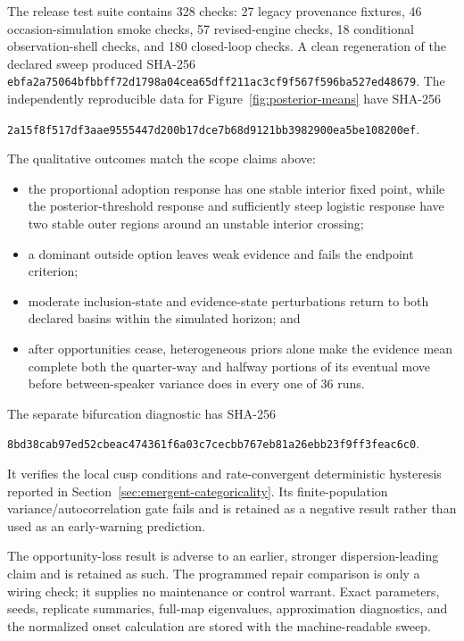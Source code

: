 \documentclass[12pt,letterpaper]{article}
\begin{document}
The release test suite contains 328 checks: 27 legacy provenance fixtures, 46
occasion-simulation smoke checks, 57 revised-engine checks, 18 conditional
observation-shell checks, and 180 closed-loop checks. A clean regeneration of
the declared sweep produced SHA-256
\nolinkurl{ebfa2a75064bfbbff72d1798a04cea65dff211ac3cf9f567f596ba527ed48679}.
The independently reproducible data for Figure~\ref{fig:posterior-means} have
SHA-256
\begin{center}
\small\nolinkurl{2a15f8f517df3aae9555447d200b17dce7b68d9121bb3982900ea5be108200ef}.
\end{center}
The qualitative outcomes match the scope claims above:

\begin{itemize}
\item the proportional adoption response has one stable interior fixed point,
  while the posterior-threshold response and sufficiently steep logistic
  response have two stable outer regions around an unstable interior crossing;
\item a dominant outside option leaves weak evidence and fails the endpoint
  criterion;
\item moderate inclusion-state and evidence-state perturbations return to both
  declared basins within the simulated horizon; and
\item after opportunities cease, heterogeneous priors alone make the evidence
  mean complete both the quarter-way and halfway portions of its eventual move
  before between-speaker variance does in every one of 36 runs.
\end{itemize}

The separate bifurcation diagnostic has SHA-256
\begin{center}
\small\nolinkurl{8bd38cab97ed52cbeac474361f6a03c7cecbb767eb81a26ebb23f9ff3feac6c0}.
\end{center}
It verifies the local cusp conditions and rate-convergent deterministic
hysteresis reported in Section~\ref{sec:emergent-categoricality}. Its
finite-population variance/autocorrelation gate fails and is retained as a
negative result rather than used as an early-warning prediction.

The opportunity-loss result is adverse to an earlier, stronger
dispersion-leading claim and is retained as such. The programmed repair
comparison is only a wiring check; it supplies no maintenance or control
warrant. Exact parameters, seeds,
replicate summaries, full-map eigenvalues, approximation diagnostics, and the
normalized onset calculation are stored with the machine-readable sweep.
\end{document}
